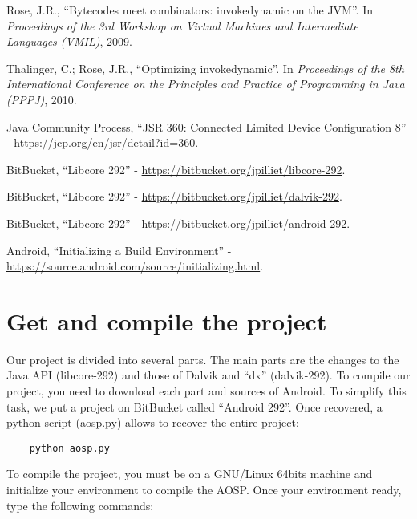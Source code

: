 \documentclass{sig-alternate}
\def \ANDROID{Android\xspace}
\begin{document}
\begin{thebibliography}{}
  Rose, J.R., ``Bytecodes meet combinators: invokedynamic on the JVM''. In {\it Proceedings of the 3rd Workshop on Virtual Machines and Intermediate Languages (VMIL)}, 2009.

  Thalinger, C.; Rose, J.R., ``Optimizing invokedynamic''. In {\it Proceedings of the 8th International Conference on the Principles and Practice of Programming in Java (PPPJ)}, 2010.

  Java Community Process, ``JSR 360: Connected Limited Device Configuration 8'' - \url{https://jcp.org/en/jsr/detail?id=360}.

  BitBucket, ``Libcore 292'' - \url{https://bitbucket.org/jpilliet/libcore-292}.

  BitBucket, ``Libcore 292'' - \url{https://bitbucket.org/jpilliet/dalvik-292}.

  BitBucket, ``Libcore 292'' - \url{https://bitbucket.org/jpilliet/android-292}.

  \ANDROID, ``Initializing a Build Environment'' - \url{https://source.android.com/source/initializing.html}.

\end{thebibliography}

\section{Get and compile the project}

  Our project is divided into several parts.
  The main parts are the changes to the Java API (libcore-292\cite{bb-libcore}) and those of Dalvik and ``dx'' (dalvik-292\cite{bb-dalvik}).
  To compile our project, you need to download each part and sources of \ANDROID.
  To simplify this task, we put a project on BitBucket called ``\ANDROID 292''\cite{bb-android}.
  Once recovered, a python script (aosp.py) allows to recover the entire project:

  {\scriptsize \begin{verbatim}
    python aosp.py
  \end{verbatim}}\vspace{-.8em}

  To compile the project, you must be on a GNU/Linux 64bits machine and initialize your environment to compile the AOSP\cite{android-sources}.
  Once your environment ready, type the following commands:
 
\end{document}
